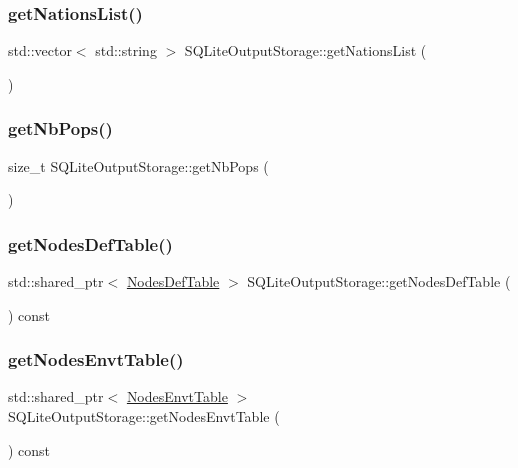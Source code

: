 \subsubsection{\texorpdfstring{getNationsList()}{getNationsList()}}
{\footnotesize\ttfamily std\+::vector$<$ std\+::string $>$ S\+Q\+Lite\+Output\+Storage\+::get\+Nations\+List (\begin{DoxyParamCaption}{ }\end{DoxyParamCaption})}

\mbox{\label{class_s_q_lite_output_storage_a96847e7bf25f616eeb97fcfd3f3997ff}} 
\subsubsection{\texorpdfstring{getNbPops()}{getNbPops()}}
{\footnotesize\ttfamily size\+\_\+t S\+Q\+Lite\+Output\+Storage\+::get\+Nb\+Pops (\begin{DoxyParamCaption}{ }\end{DoxyParamCaption})}

\mbox{\label{class_s_q_lite_output_storage_a182efeb3f844008fe576016ebeccb1fc}} 
\subsubsection{\texorpdfstring{getNodesDefTable()}{getNodesDefTable()}}
{\footnotesize\ttfamily std\+::shared\+\_\+ptr$<$ \mbox{\hyperlink{class_nodes_def_table}{Nodes\+Def\+Table}} $>$ S\+Q\+Lite\+Output\+Storage\+::get\+Nodes\+Def\+Table (\begin{DoxyParamCaption}{ }\end{DoxyParamCaption}) const}

\mbox{\label{class_s_q_lite_output_storage_ae46fbee2513b45860f9f310a089ba87f}} 
\subsubsection{\texorpdfstring{getNodesEnvtTable()}{getNodesEnvtTable()}}
{\footnotesize\ttfamily std\+::shared\+\_\+ptr$<$ \mbox{\hyperlink{class_nodes_envt_table}{Nodes\+Envt\+Table}} $>$ S\+Q\+Lite\+Output\+Storage\+::get\+Nodes\+Envt\+Table (\begin{DoxyParamCaption}{ }\end{DoxyParamCaption}) const}

